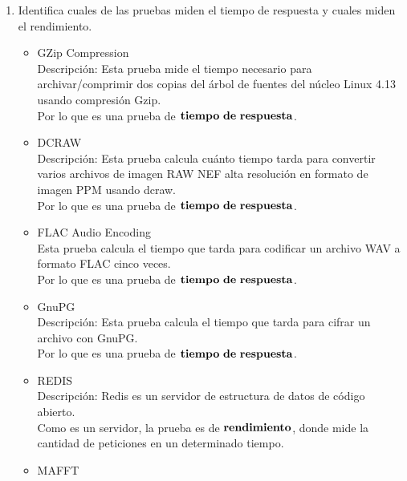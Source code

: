 \documentclass{article}
\begin{document}
    \begin{enumerate}
        \item {
            Identifica cuales de las pruebas miden el tiempo de respuesta y 
            cuales miden el rendimiento.

            \begin{itemize}
                \item {
                    GZip Compression \\
                    Descripción: Esta prueba mide el tiempo necesario para archivar/comprimir dos copias del árbol de fuentes del núcleo Linux 4.13 usando compresión Gzip. \\
                    Por lo que es una prueba de $\bf{tiempo\ de\ respuesta}$.

                }
                \item {
                    DCRAW \\
                    Descripción: Esta prueba calcula cuánto tiempo tarda para convertir varios archivos de imagen RAW NEF alta resolución en formato de imagen PPM usando dcraw. \\
                    Por lo que es una prueba de $\bf{tiempo\ de\ respuesta}$.
                }
                \item {
                    FLAC Audio Encoding \\
                    Esta prueba calcula el tiempo que tarda para codificar un archivo WAV a formato FLAC cinco veces.\\
                    Por lo que es una prueba de $\bf{tiempo\ de\ respuesta}$.
                }
                \item {
                    GnuPG \\
                    Descripción: Esta prueba calcula el tiempo que tarda para cifrar un archivo con GnuPG.  \\
                    Por lo que es una prueba de $\bf{tiempo\ de\ respuesta}$.
                }
                \item {
                    REDIS \\
                   Descripción: Redis es un servidor de estructura de datos de código abierto.\\
                    Como es un servidor, la prueba es de $\bf{rendimiento}$, donde mide la cantidad de peticiones en un 
                    determinado tiempo.
                }
                \item {
                    MAFFT \\
}
\end{itemize}}
\end{enumerate}
\end{document}
